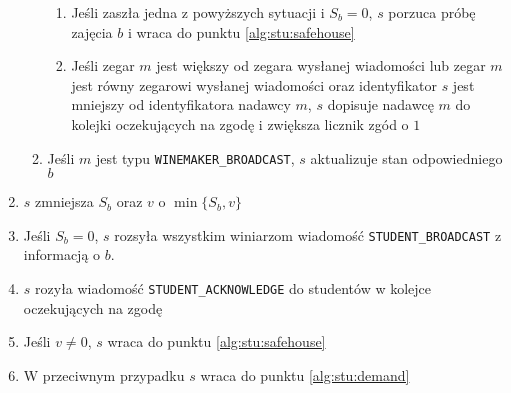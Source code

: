 \documentclass[12pt, a4paper, oneside]{article}
\begin{document}
\begin{enumerate}
\begin{enumerate}
\begin{enumerate}
                \item Jeśli zaszła jedna z powyższych sytuacji i $ \mathit{S}_b = 0 $, $ s $ porzuca próbę zajęcia $ b $ i wraca do punktu \ref{alg:stu:safehouse}
                \item Jeśli zegar $ m $ jest większy od zegara wysłanej wiadomości lub zegar $ m $ jest równy zegarowi wysłanej wiadomości oraz identyfikator $ s $ jest mniejszy od identyfikatora nadawcy $ m $, $ s $ dopisuje nadawcę $ m $ do kolejki oczekujących na zgodę i zwiększa licznik zgód o $ 1 $
            \end{enumerate}
        \item Jeśli $ m $ jest typu \texttt{WINEMAKER\_BROADCAST}, $ s $ aktualizuje stan odpowiedniego $ b $
        \end{enumerate}
    \item $ s $ zmniejsza $ \mathit{S}_b $ oraz $ v $ o $ \min\{\mathit{S}_b, v\} $
    \item Jeśli $ \mathit{S}_b = 0 $, $ s $ rozsyła wszystkim winiarzom wiadomość \texttt{STUDENT\_BROADCAST} z informacją o $ b $.
    \item $ s $ rozyła wiadomość \texttt{STUDENT\_ACKNOWLEDGE} do studentów w kolejce oczekujących na zgodę
    \item Jeśli $ v \neq 0 $, $ s $ wraca do punktu \ref{alg:stu:safehouse}
    \item W przeciwnym przypadku $ s $ wraca do punktu \ref{alg:stu:demand}
\end{enumerate}
\end{document}
